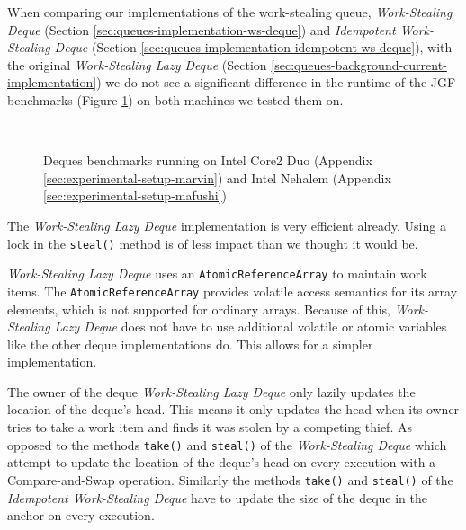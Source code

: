 When comparing our implementations of the work-stealing queue,
\emph{Work-Stealing Deque} (Section
\ref{sec:queues-implementation-ws-deque}) and \emph{Idempotent
  Work-Stealing Deque} (Section
\ref{sec:queues-implementation-idempotent-ws-deque}), with the
original \emph{Work-Stealing Lazy Deque} (Section
\ref{sec:queues-background-current-implementation}) we do not see a
significant difference in the runtime of the JGF benchmarks (Figure
\ref{fig:queues-performance-deques}) on both machines we tested them
on.

\begin{figure}[!ht]
  \centering
  \\
  \caption{Deques benchmarks running on Intel Core2 Duo (Appendix
    \ref{sec:experimental-setup-marvin}) and Intel Nehalem (Appendix
    \ref{sec:experimental-setup-mafushi})}
  \label{fig:queues-performance-deques}
\end{figure}

The \emph{Work-Stealing Lazy Deque} implementation is very efficient
already. Using a lock in the \lstinline!steal()! method is of less
impact than we thought it would be.

\emph{Work-Stealing Lazy Deque} uses an
\lstinline!AtomicReferenceArray! to maintain work items. The
\lstinline!AtomicReferenceArray! provides volatile access semantics
for its array elements, which is not supported for ordinary
arrays. Because of this, \emph{Work-Stealing Lazy Deque} does not have
to use additional volatile or atomic variables like the other deque
implementations do. This allows for a simpler implementation.

The owner of the deque \emph{Work-Stealing Lazy Deque} only lazily
updates the location of the deque's head. This means it only updates
the head when its owner tries to take a work item and finds it was
stolen by a competing thief. As opposed to the methods
\lstinline!take()! and \lstinline!steal()!  of the \emph{Work-Stealing
  Deque} which attempt to update the location of the deque's head on
every execution with a Compare-and-Swap operation. Similarly the
methods \lstinline!take()! and \lstinline!steal()! of the
\emph{Idempotent Work-Stealing Deque} have to update the size of the
deque in the anchor on every execution.

